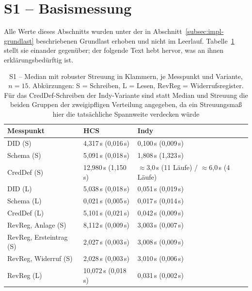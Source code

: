 \section{S1 -- Basismessung}
\label{sec:results-s1}

Alle Werte dieses Abschnitts wurden unter der in Abschnitt~\ref{subsec:impl-grundlast} beschriebenen Grundlast erhoben und nicht im Leerlauf. Tabelle~\ref{tab:results-s1} stellt sie einander gegenüber; der folgende Text hebt hervor, was an ihnen erklärungsbedürftig ist.

\begin{table}[htbp]
\renewcommand{\arraystretch}{1.3}
\footnotesize
  \centering
  \caption{S1 -- Median mit robuster Streuung in Klammern, je Messpunkt und Variante, $n=15$. Abkürzungen: S = Schreiben, L = Lesen, RevReg = Widerrufsregister. Für das CredDef-Schreiben der Indy-Variante sind statt Median und Streuung die beiden Gruppen der zweigipfligen Verteilung angegeben, da ein Streuungsmaß hier die tatsächliche Spannweite verdecken würde}
  \label{tab:results-s1}
  \begin{tabular}{p{} p{} p{}}
    \toprule
    \textbf{Messpunkt} & \textbf{HCS} & \textbf{Indy} \\
    \midrule
    DID (S) & 4,317\,s (0,016\,s) & 0,100\,s (0,009\,s) \\
    Schema (S) & 5,091\,s (0,018\,s) & 1,808\,s (1,323\,s) \\
    CredDef (S) & 12,980\,s (1,150\,s) & $\approx$3,0\,s (11 Läufe) / $\approx$6,0\,s (4 Läufe) \\
    DID (L) & 5,038\,s (0,018\,s) & 0,051\,s (0,019\,s) \\
    Schema (L) & 0,021\,s (0,005\,s) & 0,017\,s (0,014\,s) \\
    CredDef (L) & 5,101\,s (0,021\,s) & 0,042\,s (0,009\,s) \\
    RevReg, Anlage (S) & 8,112\,s (0,009\,s) & 3,003\,s (0,007\,s) \\
    RevReg, Ersteintrag (S) & 2,027\,s (0,003\,s) & 3,008\,s (0,009\,s) \\
    RevReg, Widerruf (S) & 2,028\,s (0,003\,s) & 3,010\,s (0,006\,s) \\
    RevReg (L) & 10,072\,s (0,018\,s) & 0,031\,s (0,002\,s) \\
    \bottomrule
  \end{tabular}
\end{table}



